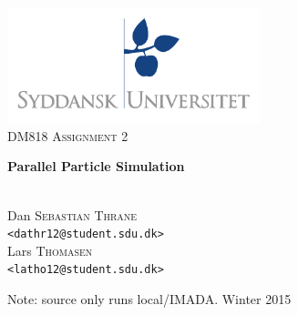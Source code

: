 \documentclass[a4paper,11pt,oneside]{book}
\title{}
\author{}
\date{}
\begin{document}
\begin{titlepage}
\begin{center}

\thispagestyle{empty}
\includegraphics[width=0.55\textwidth]{logo.pdf}\\[1cm]    
\textsc{\Large DM818 Assignment 2}\\[0.5cm]

\begin{Huge}
\textbf{Parallel Particle Simulation}
\end{Huge}

\vspace{4cm}

\begin{minipage}{1\textwidth}
\begin{center}
\emph{}\\

Dan \textsc{Sebastian Thrane}\\
\verb!<dathr12@student.sdu.dk>!\\

Lars \textsc{Thomasen}\\
\verb!<latho12@student.sdu.dk>!\\

\end{center}
\end{minipage}
\begin{minipage}{0.4\textwidth}
\end{minipage}

\vfill
Note: source only runs local/IMADA.
\vfill
{\large Winter 2015}\\

\end{center}
\end{titlepage}

\renewcommand{\contentsname}{Table of Contents}
\tableofcontents
\thispagestyle{empty}
\end{document}
